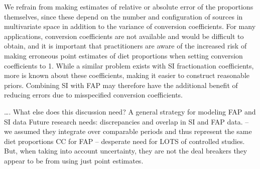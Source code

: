 \documentclass[12pt]{article}%
\begin{document}
\begin{spacing}{1.9}
\begin{flushleft}
We refrain from making estimates of relative or absolute error of the
proportions themselves, since these depend on the number and
configuration of sources in multivariate space in addition to the
variance of conversion coefficients. For many applications, conversion
coefficients are not available and would be difficult to obtain, and
it is important that practitioners are aware of the increased risk of
making erroneous point estimates of diet proportions when setting
conversion coefficients to 1. While a similar problem exists with SI
fractionation coefficients, more is known about these coefficients,
making it easier to construct reasonable priors. Combining SI with FAP
may therefore have the additional benefit of reducing errors due to
misspecified conversion coefficients.


…. What else does this discussion need?
A general strategy for modeling FAP and SI data
Future research needs: discrepancies and overlap in SI and FAP data. – we assumed they integrate over comparable periods and thus represent the same diet proportions
CC for FAP – desperate need for LOTS of controlled studies. But, when taking into account uncertainty, they are not the deal breakers they appear to be from using just point estimates.


\printbibliography

\end{flushleft}
\end{spacing}
\end{document}
